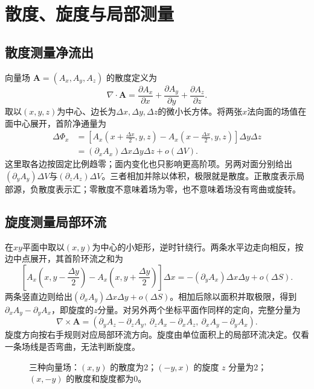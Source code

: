 \documentclass[11pt,openany,fontset=fandol]{ctexbook}
\theoremstyle{plain}\newtheorem{theorem}{定理}[chapter]\newtheorem{proposition}[theorem]{命题}
\theoremstyle{definition}\newtheorem{definition}{定义}[chapter]\newtheorem{example}{例}[chapter]
\theoremstyle{remark}\newtheorem*{remark}{说明}
\newcommand{\vct}[1]{\bm{#1}}\newcommand{\Rea}{\operatorname{Re}}\newcommand{\Ima}{\operatorname{Im}}
\begin{document}
\section{散度、旋度与局部测量}
\subsection{散度测量净流出}
向量场 $\vct A=(A_x,A_y,A_z)$ 的散度定义为
\[
\nabla\cdot\vct A=\frac{\partial A_x}{\partial x}+\frac{\partial A_y}{\partial y}+\frac{\partial A_z}{\partial z}.
\]
取以$(x,y,z)$为中心、边长为$\Delta x,\Delta y,\Delta z$的微小长方体。将两张$x$法向面的场值在面中心展开，首阶净通量为
\[
\begin{aligned}
\Delta\Phi_x
&=\left[A_x\left(x+\frac{\Delta x}{2},y,z\right)
-A_x\left(x-\frac{\Delta x}{2},y,z\right)\right]\Delta y\Delta z\\
&=(\partial_xA_x)\Delta x\Delta y\Delta z+o(\Delta V).
\end{aligned}
\]
这里取各边按固定比例趋零；面内变化也只影响更高阶项。另两对面分别给出$(\partial_yA_y)\Delta V$与$(\partial_zA_z)\Delta V$。三者相加并除以体积，极限就是散度。正散度表示局部源，负散度表示汇；零散度不意味着场为零，也不意味着场没有弯曲或旋转。

\subsection{旋度测量局部环流}
在$xy$平面中取以$(x,y)$为中心的小矩形，逆时针绕行。两条水平边走向相反，按边中点展开，其首阶环流之和为
\[
\left[A_x\left(x,y-\frac{\Delta y}{2}\right)
-A_x\left(x,y+\frac{\Delta y}{2}\right)\right]\Delta x
=-(\partial_yA_x)\Delta x\Delta y+o(\Delta S).
\]
两条竖直边则给出$(\partial_xA_y)\Delta x\Delta y+o(\Delta S)$。相加后除以面积并取极限，得到$\partial_xA_y-\partial_yA_x$，即旋度的$z$分量。对另外两个坐标平面作同样的定向，完整分量为
\[
\nabla\times\vct A=(\partial_yA_z-\partial_zA_y,\ \partial_zA_x-\partial_xA_z,\ \partial_xA_y-\partial_yA_x).
\]
旋度方向按右手规则对应局部环流方向。旋度由单位面积上的局部环流决定。仅看一条场线是否弯曲，无法判断旋度。
\begin{figure}[htbp]\centering
{}
\caption{三种向量场：$(x,y)$ 的散度为2；$(-y,x)$ 的旋度 $z$ 分量为2；$(x,-y)$ 的散度和旋度都为0。}
\label{fig:orig-037}
\end{figure}
\end{document}
